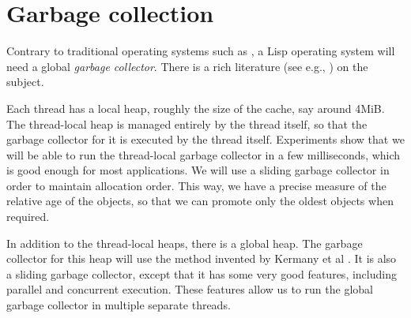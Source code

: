 \chapter{Garbage collection}
\label{chap-garbage-collection}

Contrary to traditional operating systems such as \unix{}, a Lisp
operating system will need a global \emph{garbage collector}.  There 
is a rich literature (see e.g., \cite{Jones:2011:GCH:2025255}) on the
subject. 

Each thread has a local heap, roughly the size of the cache, say
around 4MiB.  The thread-local heap is managed entirely by the thread
itself, so that the garbage collector for it is executed by the thread
itself.  Experiments show that we will be able to run the thread-local
garbage collector in a few milliseconds, which is good enough for most
applications.  We will use a sliding garbage collector in order to
maintain allocation order.  This way, we have a precise measure of the
relative age of the objects, so that we can promote only the oldest
objects when required. 

In addition to the thread-local heaps, there is a global heap.  The
garbage collector for this heap will use the method invented by
Kermany et al \cite{Kermany:2006:CCI:1133981.1134023}.  It is also a
sliding garbage collector, except that it has some very good features,
including parallel and concurrent execution.  These features allow us
to run the global garbage collector in multiple separate threads. 
